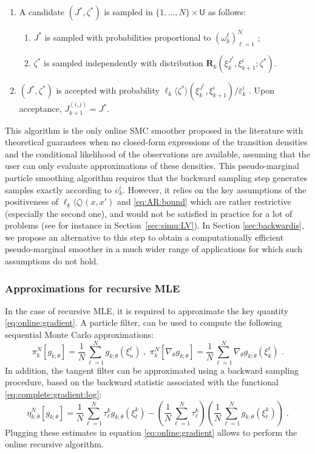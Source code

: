 \documentclass[12pt]{article}
\newcommand{\md}[1]{g_{#1}}
\newcommand{\pred}[1]{\pi_{#1}}
\newcommand{\parvec}{\theta}
\newcommand{\deriv}{\nabla_{\parvec}}
\newcommand{\N}{N}
\newcommand{\hkup}{\bar{\varepsilon}}
\newcommand{\bi}[3]{J_{#1}^{(#2, #3)}}
\newcommand{\eqsp}{\;}
\newcommand{\ewght}[2]{\ensuremath{\omega_{#1}^{#2}}}
\newcommand{\epart}[2]{\ensuremath{\xi_{#1}^{#2}}}
\newcommand{\marginalset}{\mathsf{U}}
\newcommand{\kernelmarg}{\mathbf{R}}
\newcommand{\hatqg}[1]{\mathsf{\ell}_{#1}}
\begin{document}
\begin{enumerate}
\item A candidate $(J^\ast,\zeta^\ast)$ is sampled in $\{1,\ldots, \N\}\times\marginalset$ as follows: 
\begin{enumerate}
\item $J^\ast$ is sampled with probabilities proportional to  $(\ewght{k}{\ell})_{\ell=1}^{\N}$ ;
\item $\zeta^\ast$ is sampled independently with distribution $\kernelmarg_{k}(\epart{k}{J^\ast},\epart{k+1}{i};\zeta^\ast)$.
\end{enumerate}
\item  $(J^\ast,\zeta^\ast)$ is accepted with probability $\hatqg{k}\langle \zeta^\ast\rangle(\epart{k}{J^\ast}, \epart{k+1}{i})/\hkup_k^i$ . Upon acceptance, $\bi{k+1}{i}{j} = J^*$.
\end{enumerate}
This algorithm is the only online SMC smoother proposed in the literature with  theoretical guarantees when no closed-form expressions of  the  transition  densities and the conditional likelihood of the observations are available,  assuming that the user  can only evaluate  approximations of these densities. 
This pseudo-marginal particle smoothing algorithm  requires that the backward sampling step  generates samples exactly according to $\overline \upsilon_k^i$.  
However, it relies on the key assumptions of the positiveness of $\hatqg{k}\langle \zeta\rangle(x, x')$ and \eqref{eq:AR:bound} which are rather restrictive (especially the second one), and would not be satisfied in practice for a lot of problems (see for instance in Section~\ref{sec:simu:LV}).
 In Section \ref{sec:backwardis}, we propose an alternative to this step to obtain a computationally efficient pseudo-marginal smoother in a much wider range of applications for which such assumptions do not hold.
 
\subsubsection*{Approximations for recursive MLE}

In the case of recursive MLE, it is required to approximate the key quantity \eqref{eq:online:gradient}.
A particle filter, can be used to compute the following sequential Monte Carlo approximations:
$$
\pred{k}^N[\md{k;\parvec}] = \frac{1}{N}\sum_{\ell = 1}^N \md{k;\parvec}(\epart{n}{\ell})\eqsp,\eqsp \pred{k}^N[\deriv \md{k;\parvec}] = \frac{1}{N}\sum_{\ell = 1}^N \deriv \md{k;\parvec}(\epart{k}{\ell})\eqsp.
$$
In addition, the tangent filter can be approximated using a backward sampling procedure, based on the backward statistic associated with  the functional \eqref{eq:complete:gradient:log}:
\begin{equation} 
\label{eq:tangent:identity:part:linear}
\eta_{k;\parvec}^{N}[\md{k;\parvec}] = \frac{1}{\N}\sum_{\ell=1}^\N\tau_\ell^k \md{k;\parvec}
(\epart{\ell}{k}) - \left(\frac{1}{\N}\sum_{\ell=1}^\N\tau_\ell^k\right)\left(\frac{1}{\N}\sum_{\ell=1}^\N \md{k;\parvec}(\epart{\ell}{k})\right)\eqsp.
\end{equation}
Plugging these estimates in equation \eqref{eq:online:gradient} allows to perform the online recursive algorithm. 
\end{document}
